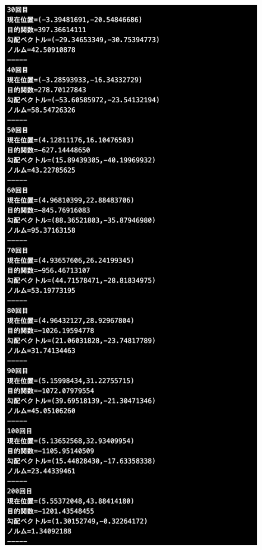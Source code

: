 \documentclass[12pt]{jarticle}
\begin{document}
\begin{figure}[h]
    \begin{minipage}{0.5\hsize}
        \begin{center}
            \includegraphics[scale=0.2]{kadai1_2s_out1_1_2.png}
        \end{center}

\end{minipage}
\end{figure}
\end{document}
